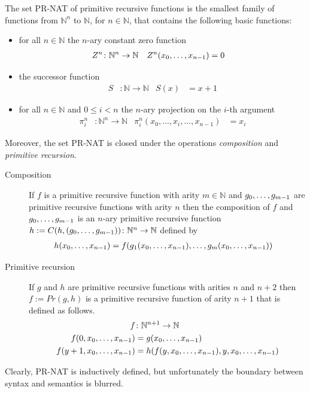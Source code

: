 \documentclass[a4paper,USenglish,cleveref, autoref, thm-restate]{lipics-v2021}
\begin{document}
The set PR-NAT of primitive recursive functions is the smallest family of functions
from ${ℕ}^n$  to ${ℕ}$, for $n\in {ℕ}$, that contains the following
basic functions:
\begin{itemize}
\item for all $n\in {ℕ}$ the $n$-ary constant zero function
  \begin{align*}
	Z^n  &\colon \mathbb{N}^n \rightarrow \mathbb{N}  &
	Z^n    ({x}_0,\dots,{x}_{n-1}) &= 0  
  \end{align*}
\item the successor function
  \begin{align*}
	S &\colon \mathbb{N} \rightarrow \mathbb{N} &
	S  (x)  &=  x + 1
  \end{align*}
\item for all $n\in {ℕ}$ and $0\le i< n$ the $n$-ary projection on
  the $i$-th argument
\begin{align*}
	\pi^{n}_{i} &\colon \mathbb{N}^n \rightarrow \mathbb{N} &
	\pi^{n}_{i}  (x_0,\dots,x_i,\dots,x_{n-1})  &= x_i
\end{align*}
\end{itemize}
Moreover, the set PR-NAT is closed under the operations \emph{composition} and \emph{primitive recursion}.
\begin{description}
\item[Composition] 
If $f$ is a primitive recursive function with arity $m \in {ℕ}$ and
${g}_0,\dots,{g}_{m-1}$ are primitive recursive functions with arity $n$ then
the composition of $f$ and ${g}_0,\dots,{g}_{m-1}$ is an $n$-ary primitive recursive function
$h := C (h,({g}_0,\dots,{g}_{m-1})) \colon \mathbb{N}^n \rightarrow \mathbb{N} $ defined by
\begin{align*}
	h  ({x}_0,\dots,{x}_{n-1})  &= f (g_1({x}_0,\dots,{x}_{n-1}),\dots,g_m({x}_0,\dots,{x}_{n-1})) 
\end{align*}

\item[Primitive recursion] 
If $g$ and $h$ are primitive recursive functions with arities $n$ and
$n+2$ then $f := Pr (g,h)$ is a primitive recursive function of arity $n+1$ that is defined as follows.
\begin{align*}
	f&\colon \mathbb{N}^{n+1} \rightarrow \mathbb{N} \\
	f  (0,{x}_0,\dots,{x}_{n-1})  &= g ({x}_0,\dots,{x}_{n-1}) \\
	f  (y + 1,{x}_0,\dots,{x}_{n-1}) &= h(  f(y,{x}_0,\dots,{x}_{n-1}),y,{x}_0,\dots,{x}_{n-1})
\end{align*}

\end{description}

Clearly, PR-NAT is inductively defined, but unfortunately the boundary
between syntax and semantics is blurred.
\end{document}
